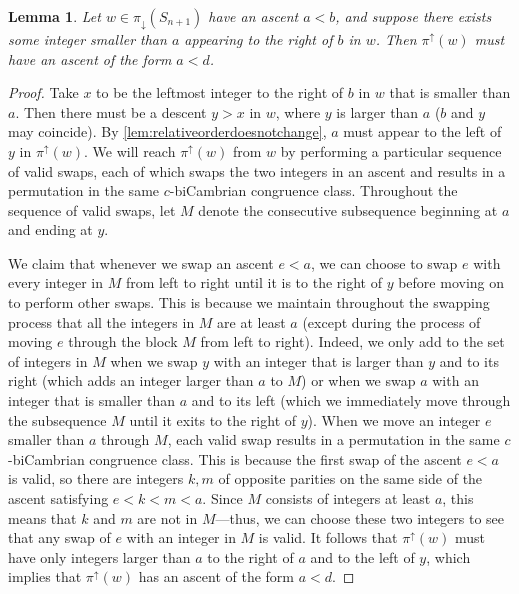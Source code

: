 \documentclass[11pt]{amsart}
\newtheorem{lemma}[theorem]{Lemma}
\theoremstyle{definition}
\begin{document}
\begin{lemma}\label{lem:ascentusuallyleadstoascent}
    Let $w\in \pi_\downarrow(S_{n+1})$ have an ascent $a<b$, and suppose there exists some integer smaller than $a$ appearing to the right of $b$ in $w$. Then $\pi^\uparrow(w)$ must have an ascent of the form $a<d$. 
\end{lemma}

\begin{proof}
    Take $x$ to be the leftmost integer to the right of $b$ in $w$ that is smaller than $a$. Then there must be a descent $y>x$ in $w$, where $y$ is larger than $a$ ($b$ and $y$ may coincide). By \cref{lem:relativeorderdoesnotchange}, $a$ must appear to the left of $y$ in $\pi^\uparrow(w)$. We will reach $\pi^\uparrow(w)$ from $w$ by performing a particular sequence of valid swaps, each of which swaps the two integers in an ascent and results in a permutation in the same $c$-biCambrian congruence class. Throughout the sequence of valid swaps, let $M$ denote the consecutive subsequence beginning at $a$ and ending at $y$.
    
     We claim that whenever we swap an ascent $e<a$, we can choose to swap $e$ with every integer in $M$ from left to right until it is to the right of $y$ before moving on to perform other swaps. This is because we maintain throughout the swapping process that all the integers in $M$ are at least $a$ (except during the process of moving $e$ through the block $M$ from left to right). Indeed, we only add to the set of integers in $M$ when we swap $y$ with an integer that is larger than $y$ and to its right (which adds an integer larger than $a$ to $M$) or when we swap $a$ with an integer that is smaller than $a$ and to its left (which we immediately move through the subsequence $M$ until it exits to the right of $y$). When we move an integer $e$ smaller than $a$ through $M$, each valid swap results in a permutation in the same $c$-biCambrian congruence class. This is because the first swap of the ascent $e<a$ is valid, so there are integers $k,m$ of opposite parities on the same side of the ascent satisfying $e<k<m<a$. Since $M$ consists of integers at least $a$, this means that $k$ and $m$ are not in $M$---thus, we can choose these two integers to see that any swap of $e$ with an integer in $M$ is valid. It follows that $\pi^\uparrow(w)$ must have only integers larger than $a$ to the right of $a$ and to the left of $y$, which implies that $\pi^\uparrow(w)$ has an ascent of the form $a<d$.
\end{proof}
\end{document}
